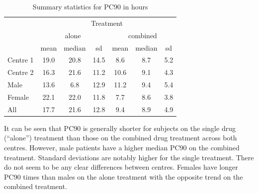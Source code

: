 \begin{table}
\centering
\caption{Summary statistics for PC90 in hours}\label{summaryPC90}
\begin{tabular}{|l|ccc|ccc|}
\hline
&\multicolumn{6}{c|}{Treatment}\\
&\multicolumn{3}{c|}{alone}&\multicolumn{3}{c|}{combined}\\
&mean&median&sd&mean&median&sd\\
\hline
Centre 1	& 19.0 & 20.8 & 14.5 & 8.6  &  8.7  &  5.2 \\
Centre 2	& 16.3  & 21.6 &  11.2 & 10.6  &  9.1  &  4.3 \\
\hline
Male		& 13.6  &  6.8 & 12.9 & 11.2  &  9.4 &   5.4 \\
Female	& 22.1  & 22.0 &  11.8 & 7.7  &  8.6  &  3.8  \\
\hline
All		& 17.7  & 21.6 &  12.8 & 9.4  &  8.9  &  4.9  \\
\hline 
\end{tabular}
\end{table}

It can be seen that PC90 is generally shorter for subjects on the single drug (``alone'') treatment than those on the combined drug treatment across both centres. However, male patients have a higher median PC90 on the combined treatment. Standard deviations are notably higher for the single treatment. There do not seem to be any clear differences between centres. Females have longer PC90 times than males on the alone treatment with the opposite trend on the combined treatment.
